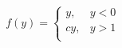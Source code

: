 \documentclass[10pt]{article}
\begin{document}
\[f\left(y\right) = \begin{cases}
y, & y < 0 \\
c y, & y > 1 \\
\end{cases}
\]
\end{document}
